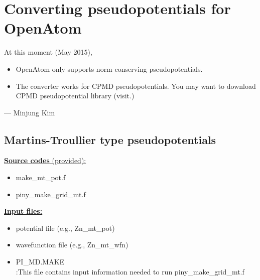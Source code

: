 %
%
%
%
%
%
%
%
%

\section{Converting pseudopotentials for OpenAtom}


At this moment (May 2015),
\begin{itemize}
\item OpenAtom only supports norm-conserving pseudopotentials.
\item The converter works for CPMD pseudopotentials. You may want to download CPMD pseudopotential library (visit{\selectfont{ http://cpmd.org/download}}.)
\end{itemize}
--- Minjung Kim

\subsection{Martins-Troullier type pseudopotentials}


\noindent
\underline{ {\bf Source codes }(provided): }
	\begin{itemize}
	\item make{\_}mt{\_}pot.f
	\item piny{\_}make{\_}grid{\_}mt.f
	\end{itemize}
	
\vskip 12pt
\noindent
\underline{ {\bf Input files:} }
	\begin{itemize}
	\item potential file (e.g., Zn{\_}mt{\_}pot)
	\item wavefunction file (e.g., Zn{\_}mt{\_}wfn)
	\item PI{\_}MD.MAKE\\:This file contains input information needed to run piny{\_}make{\_}grid{\_}mt.f
	\end{itemize}

